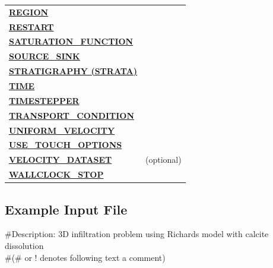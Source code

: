 \begin{longtable}{ll}
\hyperlink{target_region}{\bf REGION} & \\
\hyperlink{target_restart}{\bf RESTART} & \\
\hyperlink{target_sat}{\bf SATURATION\_FUNCTION} & \\
\hyperlink{target_src}{\bf SOURCE\_SINK} & \\
\hyperlink{target_strata}{\bf STRATIGRAPHY (STRATA)} & \\
\hyperlink{target_time}{\bf TIME} & \\
\hyperlink{target_timestep}{\bf TIMESTEPPER} & \\
\hyperlink{target_trans_cond}{\bf TRANSPORT\_CONDITION} & \\
\hyperlink{target_unifvel}{\bf UNIFORM\_VELOCITY} & \\
\hyperlink{target_touch}{\bf USE\_TOUCH\_OPTIONS} & \\
\hyperlink{target_veldata}{\bf VELOCITY\_DATASET} & (optional) \\
\hyperlink{target_wallclk}{\bf WALLCLOCK\_STOP} & \\
\bottomrule[1.5pt]
\end{longtable}

\clearpage

\subsection{Example Input File}\label{exinput}

\hypertarget{target_input_file}{}

\footnotesize
\#Description: 3D infiltration problem using Richards model with calcite dissolution\\
\noindent
\#(\# or ! denotes following text a comment)

